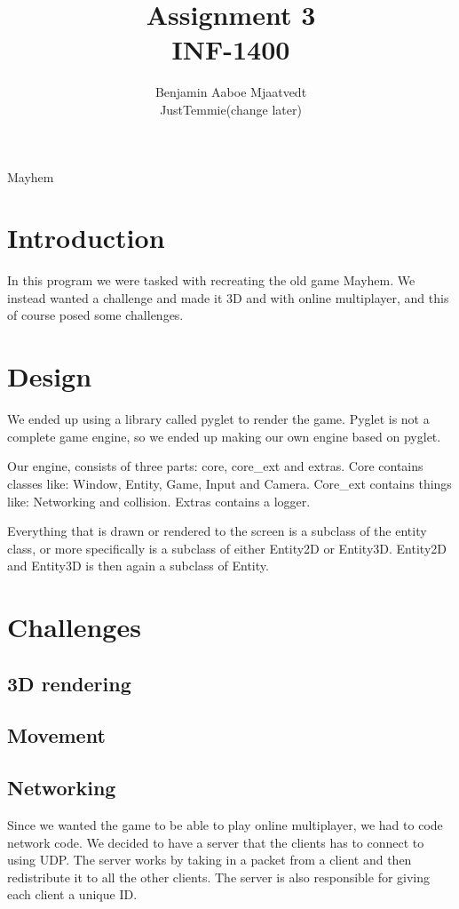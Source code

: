 \documentclass[journal]{IEEEtran}
\begin{document}
\title{Assignment 3\\ INF-1400}

\author{Benjamin Aaboe Mjaatvedt\\ JustTemmie(change later)}
%
{Mayhem}


\maketitle

\section{Introduction} \label{Section:Introduction}
In this program we were tasked with recreating the old game Mayhem. We instead wanted a challenge and made it 3D and with online multiplayer, and this of course posed some challenges.
\section{Design}\label{Section:Design}
We ended up using a library called pyglet to render the game. Pyglet is not a complete game engine, so we ended up making our own engine based on pyglet.

Our engine, consists of three parts: core, core\_ext and extras. Core contains classes like: Window, Entity, Game, Input and Camera. Core\_ext contains things like: Networking and collision. Extras contains a logger.

Everything that is drawn or rendered to the screen is a subclass of the entity class, or more specifically is a subclass of either Entity2D or Entity3D. Entity2D and Entity3D is then again a subclass of Entity.

\section{Challenges}\label{Section:Challenges}
\subsection{3D rendering}
\subsection{Movement}
\subsection{Networking}
Since we wanted the game to be able to play online multiplayer, we had to code network code.
We decided to have a server that the clients has to connect to using UDP. The server works by taking in a packet from a client and then redistribute it to all the other clients. The server is also responsible for giving each client a unique ID.
\end{document}
